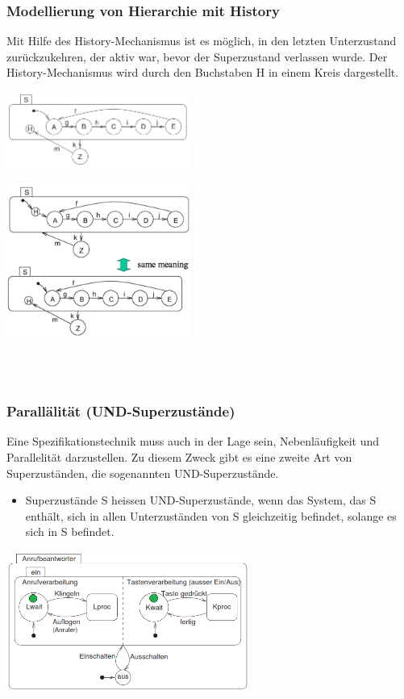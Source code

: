 {\subsubsection{Modellierung von Hierarchie mit History}
Mit Hilfe des History-Mechanismus ist es möglich, in den letzten Unterzustand zurückzukehren, der aktiv war, bevor der Superzustand verlassen wurde. Der History-Mechanismus wird durch den Buchstaben H in
einem Kreis dargestellt.\\
\begin{minipage}[hbt]{8cm}
	\includegraphics[width=6cm]{images/FSM/Hierarchie_History}
\end{minipage}
\begin{minipage}[hbt]{6cm}
	\includegraphics[width = 6cm]{images/FSM/history_default_state_mechanism}
\end{minipage}\\\\ 

\subsubsection{Parallälität (UND-Superzustände)}
Eine Spezifikationstechnik muss auch in der Lage sein, Nebenläufigkeit und Parallelität darzustellen. Zu diesem Zweck gibt es eine zweite Art von Superzuständen, die sogenannten UND-Superzustände.
\begin{itemize}
\item Superzustände S heissen UND-Superzustände, wenn das System, das S enthält, sich in allen Unterzuständen von S gleichzeitig befindet,
solange es sich in S befindet.
\end{itemize}
\includegraphics[width=8cm]{images/FSM/AND_super_state} 

}
